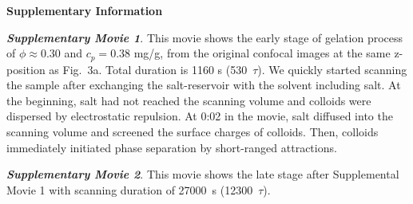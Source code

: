 \documentclass[12pt,onecolumn]{revtex4}
\begin{document}
\noindent
{\bf Supplementary Information}

\vspace{5mm}
\noindent
\emph{\bf Supplementary Movie 1}. This movie shows the early stage of gelation process of $\phi\approx 0.30$ and $c_p=0.38$ mg/g, from the original confocal images at the same z-position as Fig.~3a. Total duration is 1160 s (530~$\tau$). We quickly started scanning the sample after exchanging the salt-reservoir with the solvent including salt. At the beginning, salt had not reached the scanning volume and colloids were dispersed by electrostatic repulsion. At 0:02 in the movie, salt diffused into the scanning volume and screened the surface charges of colloids. Then, colloids immediately initiated phase separation by short-ranged attractions.

\vspace{5mm}
\noindent
\emph{\bf Supplementary Movie 2}.
This movie shows the late stage after Supplemental Movie 1 with scanning duration of 27000~s (12300~$\tau$).
\end{document}
